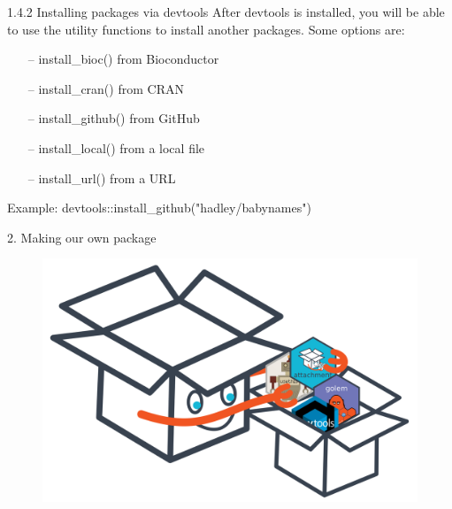 \documentclass[11pt,a4paper]{beamer}
\begin{document}


\begin{frame}[t]{1.4.2 Installing packages via devtools}
After devtools is installed, you will be able to use the utility functions to install another packages. Some options are:
\begin{itemize}
	\item[--]install\_bioc() from Bioconductor
	\item[--]install\_cran() from CRAN
	\item[--]install\_github() from GitHub
	\item[--]install\_local() from a local file
	\item[--]install\_url() from a URL
\end{itemize}

Example: 
devtools::install\_github("hadley/babynames")


\end{frame}






\begin{frame}[t]{2. Making our own package}
	

	
	\begin{figure}
		\centering
		\includegraphics[width=0.9\linewidth]{user}
		
		\label{fig:packages}
	\end{figure}
	
	
\end{frame}
\end{document}
